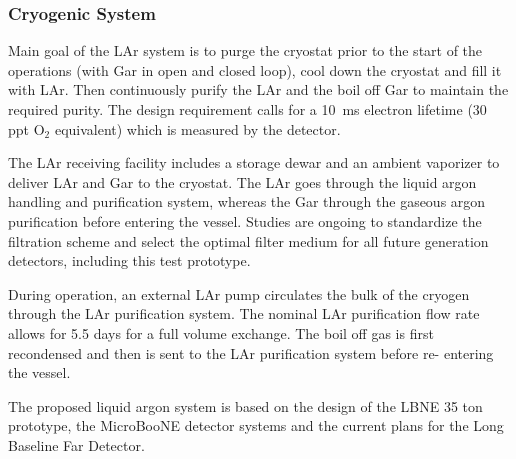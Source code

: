 \subsubsection{Cryogenic System}

Main goal of the LAr system is to purge the cryostat prior to the start of the operations (with Gar in open 
and closed loop), cool down the cryostat and fill it with LAr. Then continuously purify the LAr and the boil 
off Gar to maintain the required purity. The design requirement calls for a 10~ms electron lifetime (30 ppt O$_2$
equivalent) which is measured by the detector.

The LAr receiving facility includes a storage dewar and an ambient vaporizer to deliver LAr and Gar to the 
cryostat. The LAr goes through the liquid argon handling and purification system, whereas the Gar 
through the gaseous argon purification before entering the vessel.
Studies are ongoing to standardize the filtration scheme and select the optimal filter medium for all 
future generation detectors, including this test prototype. 

During operation, an external LAr pump circulates the bulk of the cryogen through the LAr purification 
system. The nominal LAr purification flow rate allows for 5.5 days for a full volume exchange.
The boil off gas is first recondensed and then is sent to the LAr purification system before re-
entering the vessel.

The proposed liquid argon system is based on the design of the 
LBNE 35 ton prototype, the MicroBooNE detector systems and the current plans for the Long Baseline Far 
Detector.








    
    

